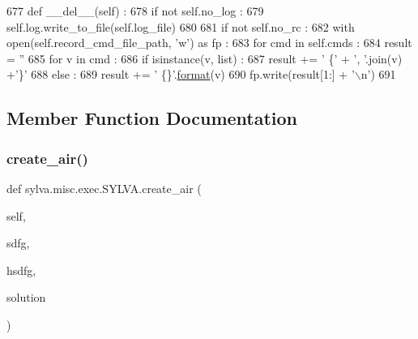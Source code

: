 \begin{DoxyCode}
677   \textcolor{keyword}{def }\_\_del\_\_(self) :
678     \textcolor{keywordflow}{if} \textcolor{keywordflow}{not} self.no\_log :
679       self.log.write\_to\_file(self.log\_file)
680 
681     \textcolor{keywordflow}{if} \textcolor{keywordflow}{not} self.no\_rc :
682       with open(self.record\_cmd\_file\_path, \textcolor{stringliteral}{'w'}) \textcolor{keyword}{as} fp :
683         \textcolor{keywordflow}{for} cmd \textcolor{keywordflow}{in} self.cmds :
684           result = \textcolor{stringliteral}{''}
685           \textcolor{keywordflow}{for} v \textcolor{keywordflow}{in} cmd :
686             \textcolor{keywordflow}{if} isinstance(v, list) :
687               result += \textcolor{stringliteral}{' \{'} + \textcolor{stringliteral}{', '}.join(v) +\textcolor{stringliteral}{'\}'}
688             \textcolor{keywordflow}{else} :
689               result += \textcolor{stringliteral}{' \{\}'}.\hyperlink{namespacesylva_1_1examples_1_1hsdfg_ab3510a0b8457362330aa4d9fd2209590}{format}(v)
690           fp.write(result[1:] + \textcolor{stringliteral}{'\(\backslash\)n'})
691 
\end{DoxyCode}


\subsection{Member Function Documentation}
\mbox{\label{classsylva_1_1misc_1_1exec_1_1_s_y_l_v_a_a0fb6646b35fdfc07ca05bb2435e4d117}} 
\subsubsection{\texorpdfstring{create\+\_\+air()}{create\_air()}}
{\footnotesize\ttfamily def sylva.\+misc.\+exec.\+S\+Y\+L\+V\+A.\+create\+\_\+air (\begin{DoxyParamCaption}\item[{}]{self,  }\item[{}]{sdfg,  }\item[{}]{hsdfg,  }\item[{}]{solution }\end{DoxyParamCaption})}




